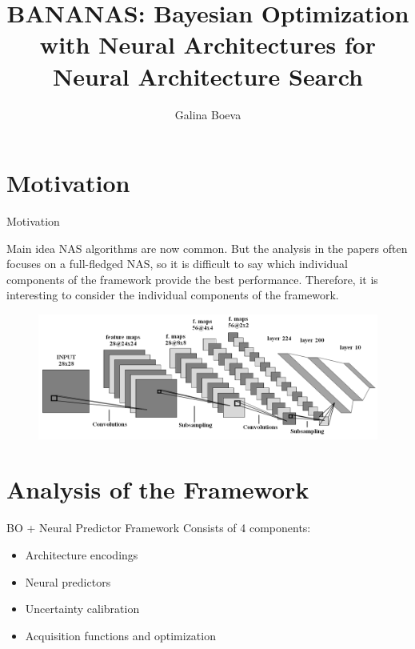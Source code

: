 \documentclass{beamer}
\title{BANANAS: Bayesian Optimization with Neural Architectures for Neural Architecture Search
}
\author{Galina Boeva}
\institute{MIPT, 2023}
\begin{document}
\begin{frame}
    \titlepage
\end{frame}


\begin{frame}
    \tableofcontents
\end{frame}


\section{Motivation}
\begin{frame}{Motivation}
    \begin{block}{Main idea}
    NAS algorithms are now common. But the analysis in the papers often focuses on a full-fledged NAS, so it is difficult to say which individual components of the framework provide the best performance. Therefore, it is interesting to consider the individual components of the framework.
    \end{block} 

    \begin{figure}
        \centering
        \includegraphics[scale=0.45]{images/svertka.png}
        \label{fig:enter-label}
    \end{figure}
    
\end{frame}


\section{Analysis of the Framework}
\begin{frame}{BO + Neural Predictor Framework}
Consists of 4 components:
\begin{itemize}
    \item Architecture encodings
    \item Neural predictors
    \item Uncertainty calibration
    \item Acquisition functions and optimization
\end{itemize}

\end{frame}
\end{document}
